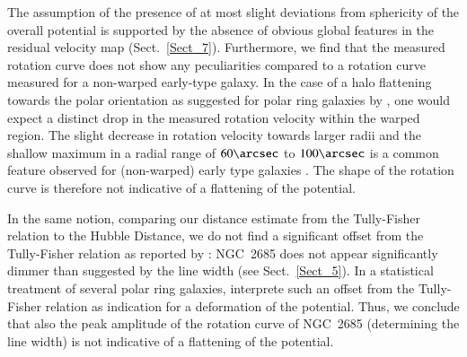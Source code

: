\documentclass[oldversion]{aa}
\begin{document}
The assumption of the presence of at most slight deviations from
sphericity of the overall potential is supported by the absence of
obvious global features in the residual velocity map
(Sect.~\ref{Sect_7}). Furthermore, we find that the measured rotation
curve does not show any peculiarities compared to a rotation curve
measured for a non-warped early-type galaxy. In the case of a halo
flattening towards the polar orientation as suggested for polar ring
galaxies by \citet[][]{Iodice03}, one would expect a distinct drop in
the measured rotation velocity within the warped region. The slight
decrease in rotation velocity towards larger radii and the shallow
maximum in a radial range of $60\arcsec$ to $100\arcsec$ is a common
feature observed for (non-warped) early type galaxies
\citep[e.g.][]{Noordermeer07}. The shape of the rotation curve is
therefore not indicative of a flattening of the potential.

In the same notion, comparing our distance estimate from the
Tully-Fisher relation to the Hubble Distance, we do not find a
significant offset from the Tully-Fisher relation as reported by
\citet[][NGC~2685 being a galaxy in their sample]{Iodice03}: NGC~2685
does not appear significantly dimmer than suggested by the 
line width (see Sect.~\ref{Sect_5}).  In a statistical treatment of
several polar ring galaxies, \citet[][]{Iodice03} interprete such an
offset from the Tully-Fisher relation as indication for a deformation
of the potential. Thus, we conclude that also the peak amplitude of
the rotation curve of NGC~2685 (determining the  line width)
is not indicative of a flattening of the potential.
%
%
\end{document}
